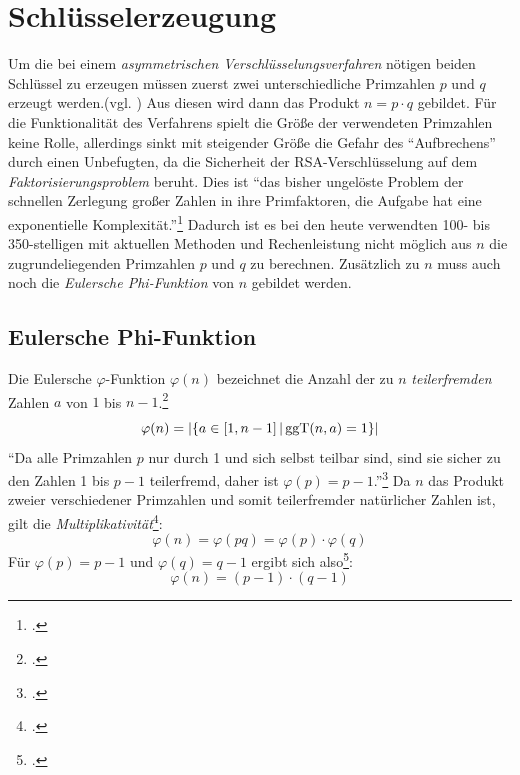 \documentclass{scrarticle}
\begin{document}
    \section{Schlüsselerzeugung}
        Um die bei einem \emph{asymmetrischen Verschlüsselungsverfahren} nötigen beiden Schlüssel zu erzeugen müssen zuerst zwei unterschiedliche Primzahlen $p$ und $q$ erzeugt werden.(vgl. \cite[278]{dankmeier2006}) Aus diesen wird dann das Produkt $n=p\cdot q$ gebildet. Für die Funktionalität des Verfahrens spielt die Größe der verwendeten Primzahlen keine Rolle, allerdings sinkt mit steigender Größe die Gefahr des \enquote{Aufbrechens} durch einen Unbefugten, da die Sicherheit der RSA-Verschlüsselung auf dem \emph{Faktorisierungsproblem} beruht. Dies ist \enquote{das bisher ungelöste Problem der schnellen Zerlegung großer Zahlen in ihre Primfaktoren, die Aufgabe hat eine exponentielle Komplexität.}\footcite[279]{dankmeier2006} Dadurch ist es bei den heute verwendten 100- bis 350-stelligen mit aktuellen Methoden und Rechenleistung nicht möglich aus $n$ die zugrundeliegenden Primzahlen $p$ und $q$ zu berechnen.
        Zusätzlich zu $n$ muss auch noch die \emph{Eulersche Phi-Funktion} von $n$ gebildet werden.
        \subsection{Eulersche Phi-Funktion}
            Die Eulersche $\varphi$-Funktion $\varphi(n)$ bezeichnet die Anzahl der zu $n$ \emph{teilerfremden} Zahlen $a$ von $1$ bis $n-1$.\footcite[vgl.][111]{swoboda2008kryptographie}
            \begin{equation}
                \varphi(n)= |\{a\in \left[ 1, n-1 \right] | \operatorname{ggT}(n, a)=1\}|
            \end{equation}
            \enquote{Da alle Primzahlen $p$ nur durch 1 und sich selbst teilbar sind, sind sie sicher zu den Zahlen 1 bis $p-1$ teilerfremd, daher ist $\varphi(p) = p-1$.}\footcite{steinfeld}
            Da $n$ das Produkt zweier verschiedener Primzahlen und somit teilerfremder natürlicher Zahlen ist, gilt die \emph{Multiplikativität}\footcite[vgl.][]{steinfeld}:
            \begin{equation}
                \varphi(n) = \varphi(pq) = \varphi(p)\cdot\varphi(q)
            \end{equation}
            Für $\varphi(p) = p-1$ und $\varphi(q) = q-1$ ergibt sich also\footcite[vgl.][279]{dankmeier2006}:
            \begin{equation}
                \varphi(n) = (p-1)\cdot(q-1)
            \end{equation}
\end{document}
